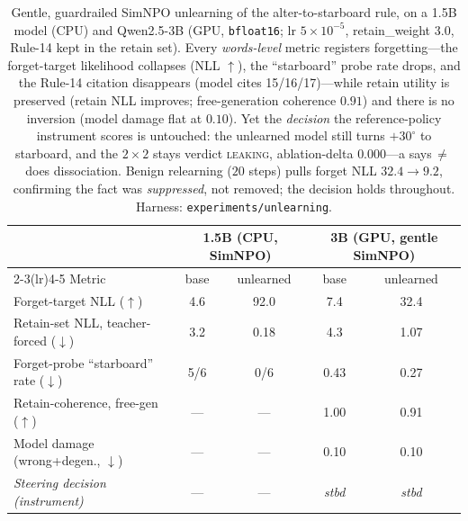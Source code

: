 \documentclass{article}
\begin{document}
\begin{table}[t]
\centering
\small
\begin{tabular}{@{}lcccc@{}}
\toprule
 & \multicolumn{2}{c}{1.5B (CPU, SimNPO)} & \multicolumn{2}{c}{3B (GPU, gentle SimNPO)} \\
\cmidrule(lr){2-3}\cmidrule(lr){4-5}
Metric & base & unlearned & base & unlearned \\
\midrule
Forget-target NLL ($\uparrow$)              & 4.6 & 92.0 & 7.4  & 32.4 \\
Retain-set NLL, teacher-forced ($\downarrow$)& 3.2 & 0.18 & 4.3  & 1.07 \\
Forget-probe ``starboard'' rate ($\downarrow$)& 5/6 & 0/6 & 0.43 & 0.27 \\
Retain-coherence, free-gen ($\uparrow$)     & --- & ---  & 1.00 & 0.91 \\
Model damage (wrong+degen., $\downarrow$)   & --- & ---  & 0.10 & 0.10 \\
\emph{Steering decision (instrument)}       & --- & ---  & \emph{stbd} & \emph{stbd} \\
\bottomrule
\end{tabular}
\caption{Gentle, guardrailed SimNPO unlearning of the alter-to-starboard rule, on a 1.5B model
(CPU) and Qwen2.5-3B (GPU, \texttt{bfloat16}; lr $5\!\times\!10^{-5}$, retain\_weight $3.0$,
Rule-14 kept in the retain set). Every \emph{words-level} metric registers forgetting---the
forget-target likelihood collapses (NLL $\uparrow$), the ``starboard'' probe rate drops, and
the Rule-14 citation disappears (model cites 15/16/17)---while retain utility is preserved
(retain NLL improves; free-generation coherence $0.91$) and there is no inversion (model damage
flat at $0.10$). Yet the \emph{decision} the reference-policy instrument scores is untouched:
the unlearned model still turns $+30^\circ$ to starboard, and the $2\times2$ stays verdict
\textup{\textsc{leaking}}, ablation-delta $0.000$---a says\,$\neq$\,does dissociation. Benign relearning
($20$ steps) pulls forget NLL $32.4\to9.2$, confirming the fact was \emph{suppressed}, not
removed; the decision holds throughout. Harness: \texttt{experiments/unlearning}.}
\label{tab:unlearn}
\end{table}
\end{document}
